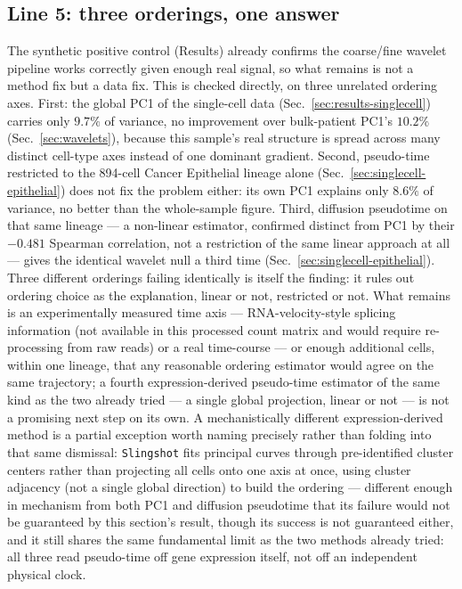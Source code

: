 \documentclass[11pt]{article}
\begin{document}
\subsection{Line 5: three orderings, one answer}
The synthetic positive control (Results) already confirms the
coarse/fine wavelet pipeline works correctly given enough real signal,
so what remains is not a method fix but a data fix. This is checked
directly, on three unrelated ordering axes. First: the global PC1 of
the single-cell data
(Sec.~\ref{sec:results-singlecell}) carries only $9.7\%$ of variance,
no improvement over bulk-patient PC1's $10.2\%$ (Sec.~\ref{sec:wavelets}),
because this sample's real structure is spread across many distinct
cell-type axes instead of one dominant gradient. Second, pseudo-time
restricted to the 894-cell Cancer Epithelial lineage alone
(Sec.~\ref{sec:singlecell-epithelial}) does not fix the problem either:
its own PC1 explains only $8.6\%$ of variance, no better than the
whole-sample figure. Third, diffusion pseudotime
\citep{haghverdi2016} on that same lineage --- a non-linear
estimator, confirmed distinct from PC1 by their $-0.481$ Spearman
correlation, not a restriction of the same linear approach at all ---
gives the identical wavelet null a third time
(Sec.~\ref{sec:singlecell-epithelial}). Three different orderings
failing identically is itself the finding: it rules out ordering choice
as the explanation, linear or not, restricted or not. What remains is
an experimentally measured time axis --- RNA-velocity-style splicing
information (not available in this processed count matrix and would
require re-processing from raw reads) or a real time-course --- or
enough additional cells, within one lineage, that any reasonable
ordering estimator would agree on the same trajectory; a fourth
expression-derived pseudo-time estimator of the same
kind as the two already tried --- a single global projection, linear or
not --- is not a promising next step on its own. A mechanistically
different expression-derived method is a partial exception worth
naming precisely rather than folding into that same dismissal:
\texttt{Slingshot} \citep{street2018slingshot} fits principal curves
through pre-identified cluster centers rather than projecting all cells
onto one axis at once, using cluster adjacency (not a single global
direction) to build the ordering --- different enough in mechanism from
both PC1 and diffusion pseudotime that its failure would not be
guaranteed by this section's result, though its success is not
guaranteed either, and it still shares the same fundamental limit as
the two methods already tried: all three read pseudo-time off gene
expression itself, not off an independent physical clock.
\end{document}
